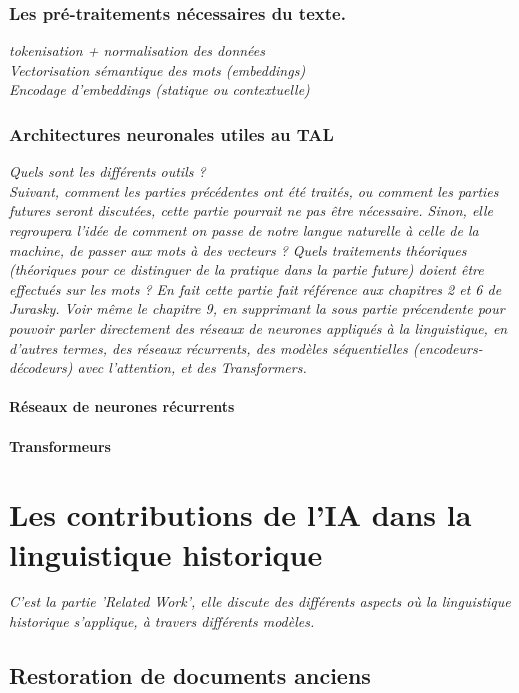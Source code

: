 \documentclass[12pt, a4, french]{report}
\begin{document}
\subsection{Les pré-traitements nécessaires du texte.}
\textit{tokenisation + normalisation des données\\
    Vectorisation sémantique des mots (embeddings)\\
    Encodage d'embeddings (statique ou contextuelle)}

\subsection{Architectures neuronales utiles au TAL}
\textit{Quels sont les différents outils ?}\\
\textit{Suivant, comment les parties précédentes ont été traités, ou comment les parties futures seront discutées, cette partie pourrait ne pas être nécessaire. Sinon, elle regroupera l'idée de comment on passe de notre langue naturelle à celle de la machine, de passer aux mots à des vecteurs ? Quels traitements théoriques (théoriques pour ce distinguer de la pratique dans la partie future) doient être effectués sur les mots ? En fait cette partie fait référence aux chapitres 2 et 6 de Jurasky. Voir même le chapitre 9, en supprimant la sous partie précendente pour pouvoir parler directement des réseaux de neurones appliqués à la linguistique, en d'autres termes, des réseaux récurrents, des modèles séquentielles (encodeurs-décodeurs) avec l'attention, et des Transformers.}\\

\subsubsection{Réseaux de neurones récurrents}

\subsubsection{Transformeurs}


\chapter{Les contributions de l'IA dans la linguistique historique}
\textit{C'est la partie 'Related Work', elle discute des différents aspects où la linguistique historique s'applique, à travers différents modèles.}
\section{Restoration de documents anciens}
\end{document}
